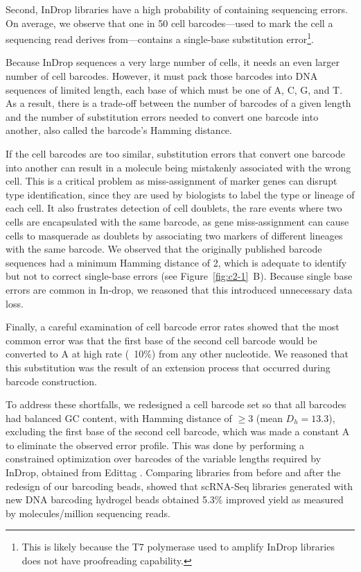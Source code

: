 Second, InDrop libraries have a high probability of containing sequencing errors. 
On average, we observe that one in 50 cell barcodes---used to mark the cell a sequencing read derives from---contains a single-base substitution error\footnote{This is likely because the T7 polymerase used to amplify InDrop libraries does not have proofreading capability.}. 

Because InDrop sequences a very large number of cells, it needs an even larger number of cell barcodes. 
However, it must pack those barcodes into DNA sequences of limited length, each base of which must be one of A, C, G, and T. 
As a result, there is a trade-off between the number of barcodes of a given length and the number of substitution errors needed to convert one barcode into another, also called the barcode's Hamming distance. 

If the cell barcodes are too similar, substitution errors that convert one barcode into another can result in a molecule being mistakenly associated with the wrong cell. 
This is a critical problem as miss-assignment of marker genes can disrupt type identification, since they are used by biologists to label the type or lineage of each cell. 
It also frustrates detection of cell doublets, the rare events where two cells are encapsulated with the same barcode, as gene miss-assignment can cause cells to masquerade as doublets by associating two markers of different lineages with the same barcode. 
We observed that the originally published barcode sequences had a minimum Hamming distance of 2, which is adequate to identify but not to correct single-base errors (see Figure~\ref{fig:c2-1}~B).  
Because single base errors are common in In-drop, we reasoned that this introduced unnecessary data loss.

Finally, a careful examination of cell barcode error rates showed that the most common error was that the first base of the second cell barcode would be converted to A at high rate (~10\%) from any other nucleotide. 
We reasoned that this substitution was the result of an extension process that occurred during barcode construction.  

To address these shortfalls, we redesigned a cell barcode set so that all barcodes had balanced GC content, with Hamming distance of $\ge3$ (mean $D_h = 13.3$), excluding the first base of the second cell barcode, which was made a constant A to eliminate the observed error profile.
This was done by performing a constrained optimization over barcodes of the variable lengths required by InDrop, obtained from Edittag \citep{Faircloth2012}.
Comparing libraries from before and after the redesign of our barcoding beads, showed that scRNA-Seq libraries generated with new DNA barcoding hydrogel beads obtained 5.3\% improved yield as measured by molecules/million sequencing reads. 

